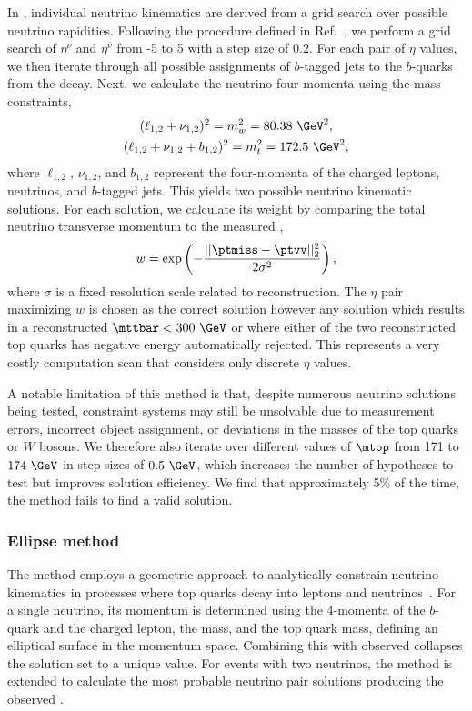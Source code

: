 In \vweight, individual neutrino kinematics are derived from a grid search over possible neutrino rapidities.
Following the procedure defined in Ref.~\cite{ATLAS:2019zrq}, we perform a grid search of $\eta^\nu$ and $\eta^{\bar\nu}$ from -5 to 5 with a step size of 0.2.
For each pair of $\eta$ values, we then iterate through all possible assignments of $b$-tagged jets to the $b$-quarks from the \ttbar decay.
Next, we calculate the neutrino four-momenta using the mass constraints,
\begin{gather}
    \label{eq:mass_constraints}
    (\ell_{1, 2} + \nu_{1, 2})^2 = m_w^2 = 80.38~\GeV^2, \\
    (\ell_{1, 2} + \nu_{1, 2} + b_{1, 2})^2 = m_t^2 = 172.5~\GeV^2,
\end{gather}
where $\ell_{1, 2}$, $\nu_{1, 2}$, and $b_{1, 2}$ represent the four-momenta of the charged leptons, neutrinos, and $b$-tagged jets.
This yields two possible neutrino kinematic solutions.
For each solution, we calculate its weight by comparing the total neutrino transverse momentum \ptvv to the measured \ptmiss,
\begin{equation}
    \label{eq:neutrino_weight}
    w = \exp \left( - \frac{||\ptmiss - \ptvv||_2^2}{2 \sigma^2} \right),
\end{equation}
where $\sigma$ is a fixed resolution scale related to \ptmiss reconstruction.
The $\eta$ pair maximizing $w$ is chosen as the correct solution however any solution which results in a reconstructed $\mttbar < 300~\GeV$ or where either of the two reconstructed top quarks has negative energy automatically rejected.
This represents a very costly computation scan that considers only discrete $\eta$ values.

A notable limitation of this method is that, despite numerous neutrino solutions being tested, constraint systems may still be unsolvable due to measurement errors, incorrect object assignment, or deviations in the masses of the top quarks or
$W$ bosons.
We therefore also iterate over different values of $\mtop$ from 171 to $174~\GeV$ in step sizes of $0.5~\GeV$, which increases the number of hypotheses to test but improves solution efficiency.
We find that approximately 5\% of the time, the \vweight method fails to find a valid solution.

\subsubsection{Ellipse method}

The \ellipse method employs a geometric approach to analytically constrain neutrino kinematics in processes where top quarks decay into leptons and neutrinos~\cite{ellipse}.
For a single neutrino, its momentum is determined using the 4-momenta of the $b$-quark and the charged lepton, the \Wboson mass, and the top quark mass, defining an elliptical surface in the momentum space.
Combining this with observed \ptmiss collapses the solution set to a unique value. For events with two neutrinos, the method is extended to calculate the most probable neutrino pair solutions producing the observed \ptmiss.

